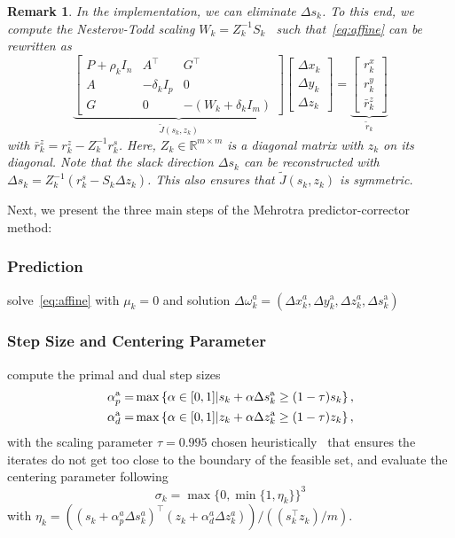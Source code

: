 \documentclass[letterpaper, 10 pt, conference]{ieeeconf}  \IEEEoverridecommandlockouts
\newtheorem{remark}{Remark}
\begin{document}
\begin{remark}
In the implementation, we can eliminate $\Delta s_k$. To this end, we compute the Nesterov-Todd scaling $W_k = Z_k^{-1} S_k$~\cite{nocedal2006} such that~\eqref{eq:affine} can be rewritten as
\[
\underbrace{\begin{bmatrix}
P + \rho_k I_n & A^\top & G^\top \\[0.12cm]
A & -\delta_k I_p & 0 \\[0.12cm]
G & 0 & -(W_k + \delta_k I_m)
\end{bmatrix}}_{\tilde J(s_k,z_k)}
\begin{bmatrix}
\Delta x_k \\[0.12cm]
\Delta y_k \\[0.12cm]
\Delta z_k
\end{bmatrix}
=\underbrace{\begin{bmatrix}
r^x_k \\[0.12cm]
r^y_k \\[0.12cm]
\bar{r}^z_k
\end{bmatrix}}_{\tilde r_k}
\]
with $\bar{r}^z_k = r^z_k - Z_k^{-1} r^s_k$. Here, $Z_k \in \mathbb{R}^{m \times m}$ is a diagonal matrix with $z_k$ on its diagonal.
Note that the slack direction $\Delta s_k$ 
can be reconstructed with $\Delta s_k = Z_k^{-1}(r^s_k - S_k \Delta z_k)$.
This also ensures that $\tilde J(s_k,z_k)$ is symmetric.
\end{remark}

Next, we present the three main steps of the Mehrotra predictor-corrector method:

\subsubsection{Prediction}
solve~\eqref{eq:affine} with $\mu_k=0$ and solution $\Delta \omega_k^a = (\Delta x_k^a, \Delta y_k^\text{a},\Delta z_k^a, \Delta s_k^\text{a})$
\subsubsection{Step Size and Centering Parameter} compute the primal and dual step sizes
\begin{align}\notag
\alpha^\text{a}_p =&\max\left\{\alpha\in[0,1]| s_k+\alpha \Delta s_k^\text{a}\geq (1-\tau)s_k\right\},\\\label{eq:stepsize}
\alpha^\text{a}_d =&\max\left\{\alpha\in[0,1]| z_k+\alpha \Delta z_k^\text{a}\geq (1-\tau)z_k\right\},
\end{align}
with the scaling parameter $\tau = 0.995$ chosen heuristically~\cite{pougkakiotis2021,nocedal2006} that ensures the iterates do not get too close to the boundary of the feasible set, and evaluate the centering parameter following~\cite{mehrotra1992}
\begin{equation}
\label{eq:parameter}
\sigma_k  =\max \{0, \min \{1, \eta_k\}\}^3
\end{equation}
with $\eta_k  =\left(\left(s_k+\alpha^a_p \Delta s^a_k\right)^\top\left(z_k+\alpha^a_d \Delta z^a_k\right)\right)/\left(\left(s_k^\top z_k\right) / m \right)$.
\end{document}
